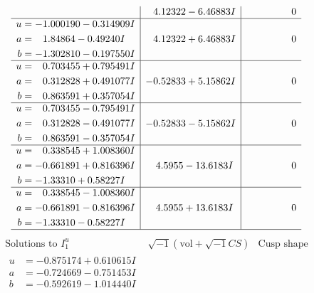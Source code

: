 \documentclass[1p]{elsarticle_modified}
\theoremstyle{definition}
\newcommand{\I}{\sqrt{-1}}
\begin{document}
$$\begin{array}{c|c|c}
 & \phantom{-}4.12322 - 6.46883 I & \phantom{-0.000000 } 0 \\ \hline\begin{aligned}
u &= -1.000190 - 0.314909 I \\
a &= \phantom{-}1.84864 - 0.49240 I \\
b &= -1.302810 - 0.197550 I\end{aligned}
 & \phantom{-}4.12322 + 6.46883 I & \phantom{-0.000000 } 0 \\ \hline\begin{aligned}
u &= \phantom{-}0.703455 + 0.795491 I \\
a &= \phantom{-}0.312828 + 0.491077 I \\
b &= \phantom{-}0.863591 + 0.357054 I\end{aligned}
 & -0.52833 + 5.15862 I & \phantom{-0.000000 } 0 \\ \hline\begin{aligned}
u &= \phantom{-}0.703455 - 0.795491 I \\
a &= \phantom{-}0.312828 - 0.491077 I \\
b &= \phantom{-}0.863591 - 0.357054 I\end{aligned}
 & -0.52833 - 5.15862 I & \phantom{-0.000000 } 0 \\ \hline\begin{aligned}
u &= \phantom{-}0.338545 + 1.008360 I \\
a &= -0.661891 + 0.816396 I \\
b &= -1.33310 + 0.58227 I\end{aligned}
 & \phantom{-}4.5955 - 13.6183 I & \phantom{-0.000000 } 0 \\ \hline\begin{aligned}
u &= \phantom{-}0.338545 - 1.008360 I \\
a &= -0.661891 - 0.816396 I \\
b &= -1.33310 - 0.58227 I\end{aligned}
 & \phantom{-}4.5955 + 13.6183 I & \phantom{-0.000000 } 0\\
 \hline 
 \end{array}$$\newpage$$\begin{array}{c|c|c}  
\text{Solutions to }I^u_{1}& \I (\text{vol} + \sqrt{-1}CS) & \text{Cusp shape}\\
 \hline 
\begin{aligned}
u &= -0.875174 + 0.610615 I \\
a &= -0.724669 - 0.751453 I \\
b &= -0.592619 - 1.014440 I\end{aligned}

\end{array}$$
\end{document}
